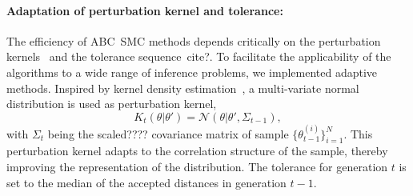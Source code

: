 \documentclass[10pt,letterpaper]{article}
\begin{document}
\paragraph{Adaptation of perturbation kernel and tolerance:}
The efficiency of ABC~SMC methods depends critically on the perturbation kernels~\cite{FilippiBar2013} and the tolerance sequence~{\color{green}cite?}. To facilitate the applicability of the algorithms to a wide range of inference problems, we implemented adaptive methods. Inspired by kernel density estimation~\cite{Scott1992}, a multi-variate normal distribution is used as perturbation kernel,
\begin{equation*}
K_t(\theta|\theta') = \mathcal{N}(\theta|\theta',\Sigma_{t-1}),
\end{equation*}
with $\Sigma_t$ being the {\color{green}scaled????} covariance matrix of sample $\{\theta^{(i)}_{t-1}\}_{i=1}^N$. This perturbation kernel adapts to the correlation structure of the sample, thereby improving the representation of the distribution. The tolerance for generation $t$ is set to the median of the accepted distances in generation $t-1$.
\end{document}
